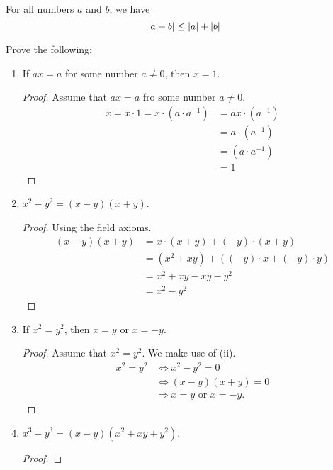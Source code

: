 \begin{thm}
     For all numbers $a$ and $b$, we have
     \begin{equation*}
         \left\lvert a+b\right\rvert \leq \left\lvert a\right\rvert+\left\lvert b\right\rvert
     \end{equation*}
\end{thm}
\begin{exercise}[\textbf{1}]
     Prove the following:
    \begin{enumerate}
        \item If $ax=a$ for some number $a \neq 0$, then $x=1$.
        \begin{proof}
            Assume that $ax=a$ fro some number $a\neq 0$. 
            \begin{align*}
                x = x\cdot 1 = x\cdot (a\cdot a^{-1}) &= ax \cdot (a^{-1}) \\
                &= a \cdot (a^{-1}) \\
                &= (a\cdot a^{-1}) \\   
                &= 1
            \end{align*}
        \end{proof}
        \item $x^2-y^2 = (x-y)(x+y)$.
        \begin{proof} Using the field axioms.
             \begin{align*}
                 (x-y)(x+y) &= x\cdot (x+y) + (-y)\cdot (x+y) \\
                 &= (x^2+xy)+((-y)\cdot x+(-y)\cdot y) \\
                 &= x^2+xy-xy-y^2 \\
                 &= x^2-y^2
             \end{align*}
        \end{proof}
        \item If $x^2=y^2$, then $x=y$ or $x=-y$.
        \begin{proof}Assume that $x^2=y^2$. We make use of (ii).
             \begin{align*}
                 x^2 = y^2 &\Leftrightarrow  x^2-y^2 = 0 \\
                 & \Leftrightarrow (x-y)(x+y) =0 \\
                 & \Rightarrow x=y \text{ or } x=-y.
             \end{align*}
        \end{proof}
        \item $x^3-y^3=(x-y)(x^2+xy+y^2)$.
        \begin{proof}

\end{proof}
\end{enumerate}
\end{exercise}
